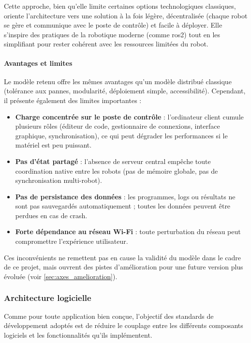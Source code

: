 Cette approche, bien qu’elle limite certaines options technologiques classiques, oriente l’architecture vers une solution à la fois légère, décentralisée (chaque robot se gère et communique avec le poste de contrôle) et facile à déployer.
Elle s’inspire des pratiques de la robotique moderne (comme \acrshort{ros}2) tout en les simplifiant pour rester cohérent avec les ressources limitées du robot.

\paragraph{Avantages et limites}
Le modèle retenu offre les mêmes avantages qu'un modèle distribué classique (tolérance aux pannes, modularité, déploiement simple, accessibilité).
Cependant, il présente également des limites importantes :
\begin{itemize}
    \item \textbf{Charge concentrée sur le poste de contrôle} : l’ordinateur client cumule plusieurs rôles (éditeur de code, gestionnaire de connexions, interface graphique, synchronisation), ce qui peut dégrader les performances si le matériel est peu puissant.
    
    \item \textbf{Pas d’état partagé} : l’absence de serveur central empêche toute coordination native entre les robots (pas de mémoire globale, pas de synchronisation multi-robot).
    
    \item \textbf{Pas de persistance des données} : les programmes, logs ou résultats ne sont pas sauvegardés automatiquement ; toutes les données peuvent être perdues en cas de crash.
    
    \item \textbf{Forte dépendance au réseau Wi-Fi} : toute perturbation du réseau peut compromettre l’expérience utilisateur.
\end{itemize}

Ces inconvénients ne remettent pas en cause la validité du modèle dans le cadre de ce projet, mais ouvrent des pistes d’amélioration pour une future version plus évoluée (voir \autoref{sec:axes_amelioration}).

\subsubsection{Architecture logicielle} \label{sec:architecture_logicielle}
Comme pour toute application bien conçue, l’objectif des standards de développement adoptés est de réduire le couplage entre les différents composants logiciels et les fonctionnalités qu’ils implémentent.


